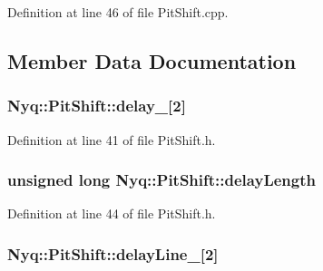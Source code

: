 Definition at line 46 of file Pit\+Shift.\+cpp.



\subsection{Member Data Documentation}
\subsubsection[{\texorpdfstring{delay\+\_\+}{delay_}}]{ Nyq\+::\+Pit\+Shift\+::delay\+\_\+\mbox{[}2\mbox{]}\hspace{0.3cm}{\ttfamily [protected]}}\hypertarget{class_nyq_1_1_pit_shift_aefbb311953198a8708549c5c88d2ef6c}{}\label{class_nyq_1_1_pit_shift_aefbb311953198a8708549c5c88d2ef6c}


Definition at line 41 of file Pit\+Shift.\+h.

\subsubsection[{\texorpdfstring{delay\+Length}{delayLength}}]{\setlength{\rightskip}{0pt plus 5cm}unsigned long Nyq\+::\+Pit\+Shift\+::delay\+Length\hspace{0.3cm}{\ttfamily [protected]}}\hypertarget{class_nyq_1_1_pit_shift_a457baebe37ff314c99f47e2d0d9a7675}{}\label{class_nyq_1_1_pit_shift_a457baebe37ff314c99f47e2d0d9a7675}


Definition at line 44 of file Pit\+Shift.\+h.

\subsubsection[{\texorpdfstring{delay\+Line\+\_\+}{delayLine_}}]{ Nyq\+::\+Pit\+Shift\+::delay\+Line\+\_\+\mbox{[}2\mbox{]}\hspace{0.3cm}{\ttfamily [protected]}}\hypertarget{class_nyq_1_1_pit_shift_a739400e0b6dfa15fb81af53aca21bbb2}{}\label{class_nyq_1_1_pit_shift_a739400e0b6dfa15fb81af53aca21bbb2}


